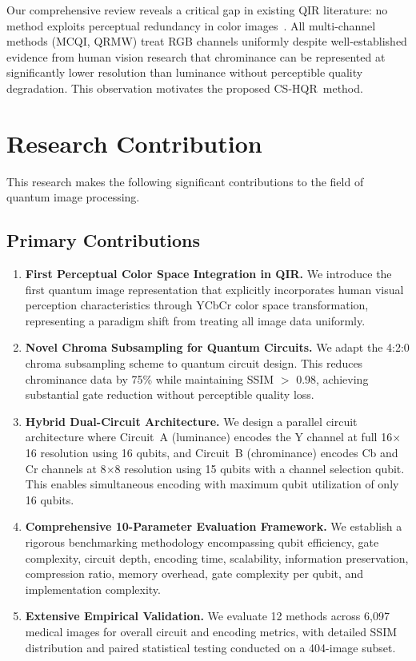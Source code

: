 \documentclass{ipol}
\newcommand{\cshqr}{\textsc{CS-HQR}}
\newcommand{\mcqi}{\textsc{MCQI}}
\begin{document}
Our comprehensive review reveals a critical gap in existing QIR literature:
no method exploits perceptual redundancy in color images~\cite{ref61,ref63,ref64,ref67}. All multi-channel
methods (\mcqi, QRMW) treat RGB channels uniformly despite well-established
evidence from human vision research that chrominance can be represented at
significantly lower resolution than luminance without perceptible quality
degradation. This observation motivates the proposed \cshqr\ method.

\FloatBarrier
\section{Research Contribution}
\label{sec:contribution}

This research makes the following significant contributions to the field of
quantum image processing.

\FloatBarrier
\subsection{Primary Contributions}

\begin{enumerate}[label=\textbf{C\arabic*:}]
  \item \textbf{First Perceptual Color Space Integration in QIR.}
    We introduce the first quantum image representation that explicitly
    incorporates human visual perception characteristics through YCbCr color
    space transformation, representing a paradigm shift from treating all
    image data uniformly.
  \item \textbf{Novel Chroma Subsampling for Quantum Circuits.}
    We adapt the 4:2:0 chroma subsampling scheme to quantum circuit design.
    This reduces chrominance data by 75\% while maintaining SSIM $>$ 0.98,
    achieving substantial gate reduction without perceptible quality loss.
  \item \textbf{Hybrid Dual-Circuit Architecture.}
    We design a parallel circuit architecture where Circuit~A (luminance)
    encodes the Y channel at full 16$\times$16 resolution using 16 qubits,
    and Circuit~B (chrominance) encodes Cb and Cr channels at 8$\times$8
    resolution using 15 qubits with a channel selection qubit. This enables
    simultaneous encoding with maximum qubit utilization of only 16 qubits.
  \item \textbf{Comprehensive 10-Parameter Evaluation Framework.}
    We establish a rigorous benchmarking methodology encompassing qubit
    efficiency, gate complexity, circuit depth, encoding time, scalability,
    information preservation, compression ratio, memory overhead, gate
    complexity per qubit, and implementation complexity.
  \item \textbf{Extensive Empirical Validation.}
    We evaluate 12 methods across 6,097 medical images for overall circuit
    and encoding metrics, with detailed SSIM distribution and paired
    statistical testing conducted on a 404-image subset.
\end{enumerate}
\end{document}
